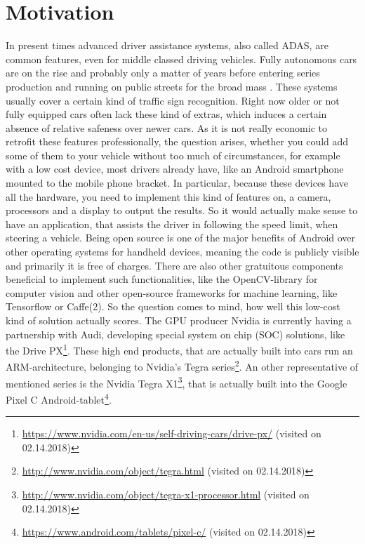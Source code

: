 
\chapter{Motivation}\label{chapter:motivation}
In present times advanced driver assistance systems, also called ADAS, are common features, even for middle classed driving vehicles. Fully autonomous cars are on the rise and probably only a matter of years before entering series production and running on public streets for the broad mass . These systems usually cover a certain kind of traffic sign recognition. Right now older or not fully equipped cars often lack these kind of extras, which induces a certain absence of relative safeness over newer cars. As it is not really economic to retrofit these features professionally, the question arises, whether you could add some of them to your vehicle without too much of circumstances, for example with a low cost device, most drivers already have, like an Android smartphone mounted to the mobile phone bracket. In particular, because these devices have all the hardware, you need to implement this kind of features on, a camera, processors and a display to output the results. So it would actually make sense to have an application, that assists the driver in following the speed limit, when steering a vehicle. \newline
Being open source is one of the major benefits of Android over other operating systems for handheld devices, meaning the code is publicly visible and primarily it is free of charges. There are also other gratuitous components beneficial to implement such functionalities, like the OpenCV-library for computer vision and other open-source frameworks for machine learning, like Tensorflow or Caffe(2). So the question comes to mind, how well this low-cost kind of solution actually scores.\newline
The GPU producer Nvidia is currently having a partnership with Audi, developing special system on  chip (SOC) solutions, like the Drive PX\footnote{\url{https://www.nvidia.com/en-us/self-driving-cars/drive-px/} (visited on 02.14.2018)}. These high end products, that are actually built into cars run an ARM-architecture,  belonging to Nvidia's Tegra series\footnote{\url{http://www.nvidia.com/object/tegra.html} (visited on 02.14.2018)}. An other representative of mentioned series is the Nvidia Tegra X1\footnote{\url{http://www.nvidia.com/object/tegra-x1-processor.html} (visited on 02.14.2018)}, that is actually built into the Google Pixel C Android-tablet\footnote{\url{https://www.android.com/tablets/pixel-c/} (visited on 02.14.2018)}. 
